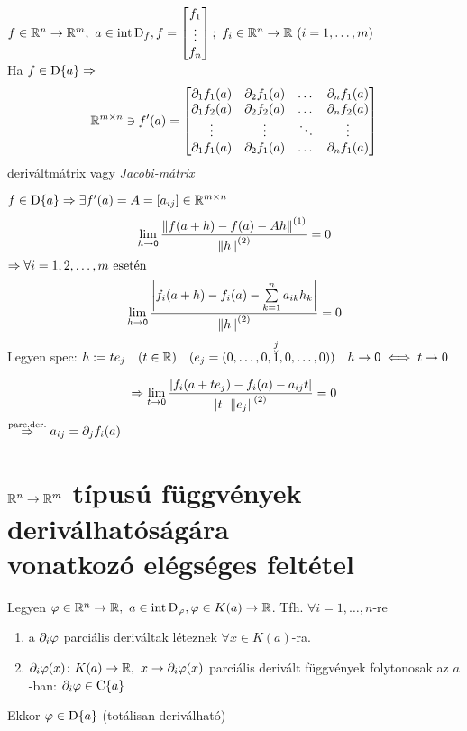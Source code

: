 \begin{te}
  $f\in\RnRm,\ a\in\intD_f,\\ f=\begin{bmatrix}f_1\\\vdots\\f_n\end{bmatrix};\ f_i\in\RnR\ (i=1,\dotsc,m)$\\
  \vspace{.1em}
  Ha $f\in\operatorname{D}\{a\}\Rightarrow\\$
  \[\mathbb{R}^{m\times n}\owns f'(a) = \begin{bmatrix}
    \partial_1 f_1(a) & \partial_2 f_1(a) & \dots & \partial_n f_1(a)\\
    \partial_1 f_2(a) & \partial_2 f_2(a) & \dots & \partial_n f_2(a)\\
    \vdots & \vdots & \ddots & \vdots \\
    \partial_1 f_1(a) & \partial_2 f_1(a) & \dots & \partial_n f_1(a)
    \end{bmatrix}\]
  deriváltmátrix vagy \emph{Jacobi-mátrix}
\end{te}

\begin{biz}
    $f\in\operatorname{D}\{a\} \Rightarrow \exists f'(a) = A = \left[ a_{ij}\right] \in \mathbb{R}^{m\times n}$
    \[\displaystyle\lim_{h\to\mathsf{0}} \dfrac{\left\Vert f(a+h)-f(a) -Ah\right\Vert^{(1)}}{\left\Vert h\right\Vert^{(2)}}=0\]
    $\Rightarrow \forall i = 1,2,\dotsc,m \text{ esetén}$
    \[\displaystyle\lim_{h\to\mathsf{0}} \dfrac{\left|f_i(a+h)- f_i(a) - \sum\limits_{k=1}^n a_{ik} h_k\right|}{\left\Vert h\right\Vert^{(2)}}=0\]
    Legyen spec: $h := te_j\quad (t\in\mathbb{R})\quad (e_j = (0,\dotsc,0,\overset{j}{\breve{1}},0,\dotsc,0))\quad h\to\mathsf{0}
    \iff t\to0$

    \[\displaystyle\Rightarrow \lim_{t\to0}\dfrac{\left|f_i(a+te_j)-f_i(a) - a_{ij}t\right|}{|t|\,\left\Vert e_j\right\Vert^{(2)}} = 0\]
    $\overset{\text{parc.der.}}{\Rightarrow} a_{ij} = \partial_j f_i(a)$
\end{biz}

\newpage
\section[$\RnRm$ típusú függvények deriválhatóságára vonatkozó elégséges feltétel]
	{$\RnRm$ típusú függvények deriválhatóságára\\vonatkozó elégséges feltétel}

\begin{te}
  Legyen $\varphi\in\RnR,\ a\in\intD_\varphi,\\\varphi\in K(a)\n\R$.
  Tfh. $\forall i=1,\dotsc,n$-re
  \begin{enumerate}
    \item a $\partial_i\varphi$ parciális deriváltak léteznek $\forall x\in K(a)$-ra.
    \item $\partial_i\vfi(x)\colon K(a)\n\R,\ x\n\partial_i \vfi(x)$ parciális derivált függvények
    folytonosak az $a$-ban: $\partial_i \varphi\in\operatorname{C}\{a\}$
  \end{enumerate}
Ekkor  $\varphi\in\operatorname{D}\{a\}$ (totálisan deriválható)
\end{te}


